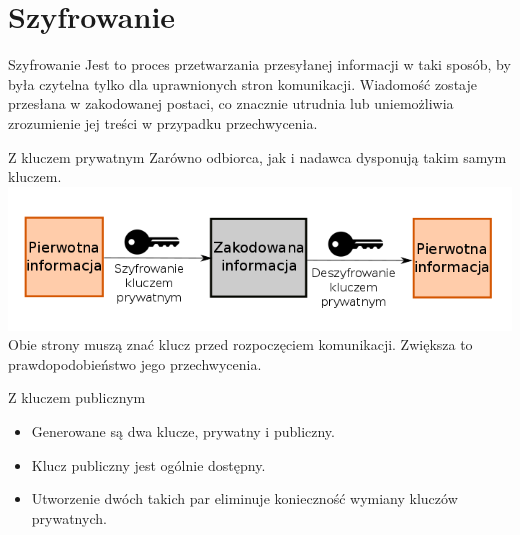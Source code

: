 \section{Szyfrowanie}

\begin{frame}
	\begin{alertblock}{Szyfrowanie}
		Jest to proces przetwarzania przesyłanej informacji w taki sposób, by była czytelna tylko dla uprawnionych stron komunikacji. Wiadomość zostaje przesłana w zakodowanej postaci, co znacznie utrudnia lub uniemożliwia zrozumienie jej treści w przypadku przechwycenia.
	\end{alertblock}
\end{frame}

\begin{frame}{Z kluczem prywatnym}
	Zarówno odbiorca, jak i nadawca dysponują takim samym kluczem.\\
	\vspace{\fill}
	\includegraphics[height=0.25\paperwidth]{images/priv-key.png}
	\vspace{\fill}
	Obie strony muszą znać klucz przed rozpoczęciem komunikacji. Zwiększa to prawdopodobieństwo jego przechwycenia.	
\end{frame}

\begin{frame}{Z kluczem publicznym}
		\begin{itemize}
			\item Generowane są dwa klucze, prywatny i publiczny.
			\item Klucz publiczny jest ogólnie dostępny.
			\item Utworzenie dwóch takich par eliminuje konieczność wymiany kluczów prywatnych. 
		\end{itemize}	
\end{frame}

